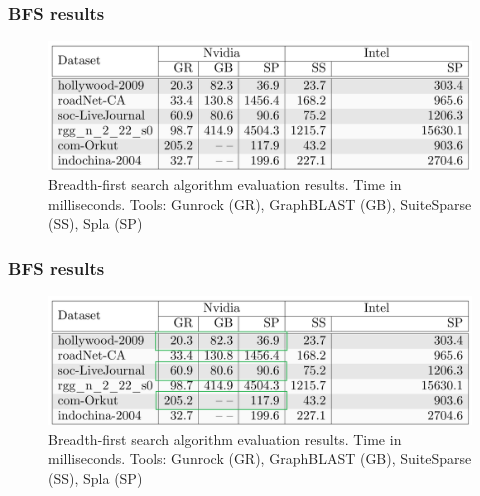 \documentclass[aspectratio=169,xcolor=table,english]{beamer}
\begin{document}
\begin{frame}[fragile] \frametitle{BFS results}
    \begin{center}
    \begin{minipage}[m]{0.9\linewidth}
        \begin{figure}
            \centering
            \includegraphics[width=1.0\textwidth]{figures/exp_bfs_res.png}
            \caption{Breadth-first search algorithm evaluation results. Time in milliseconds. Tools: Gunrock (GR), GraphBLAST (GB), SuiteSparse (SS), Spla (SP)}
        \end{figure}
    \end{minipage}\hfill   
    \end{center}
\end{frame}

\begin{frame}[fragile] \frametitle{BFS results}
    \begin{center}
    \begin{minipage}[m]{0.9\linewidth}
        \begin{figure}
            \centering
            \includegraphics[width=1.0\textwidth]{figures/exp_bfs_res_good.png}
            \caption{Breadth-first search algorithm evaluation results. Time in milliseconds. Tools: Gunrock (GR), GraphBLAST (GB), SuiteSparse (SS), Spla (SP)}
        \end{figure}
    \end{minipage}\hfill   
    \end{center}
\end{frame}
\end{document}
